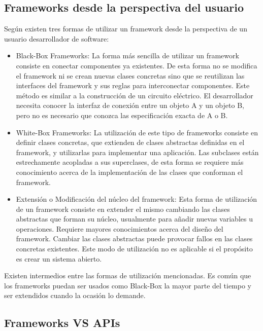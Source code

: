 \subsection{Frameworks desde la perspectiva del usuario}
\label{sec:tipos_framework}
    Según \cite{JohnsonFeb97} existen tres formas de utilizar un framework
    desde la perspectiva de un usuario desarrollador de software: 
\begin{itemize}
    \item Black-Box Frameworks: La forma más sencilla de utilizar un framework
    consiste en conectar componentes ya existentes. De esta forma no se modifica
    el framework ni se crean nuevas clases concretas sino que se reutilizan las
    interfaces del framework y sus reglas para interconectar componentes. Este
    método es similar a la construcción de un circuito eléctrico. El
    desarrollador necesita conocer la interfaz de conexión entre un objeto A y
    un objeto B, pero no es necesario que conozca las especificación exacta de A o B.

    \item White-Box Frameworks: La utilización de este tipo de
    frameworks consiste en definir clases concretas, que extienden de clases
    abstractas definidas en el framework, y utilizarlas para implementar una
    aplicación. Las subclases están estrechamente acopladas a sus superclases,
    de esta forma se requiere más conocimiento acerca de la implementación de
    las clases que conforman el framework.
	
	\item Extensión o Modificación del núcleo del framework:  Esta forma de
	utilización de un framework consiste en extender el mismo cambiando las
	clases abstractas que forman su núcleo, usualmente para añadir nuevas
	variables u operaciones. Requiere mayores conocimientos acerca del diseño del
    framework. Cambiar las clases abstractas puede provocar fallos en las
    clases concretas existentes. Este modo de utilización no es
    aplicable si el propósito es crear un sistema abierto.
\end{itemize}

Existen intermedios entre las formas de utilización mencionadas. Es común
que los frameworks puedan ser usados como Black-Box la mayor parte del tiempo y
ser extendidos cuando la ocasión lo demande.

\subsection{Frameworks VS APIs}

